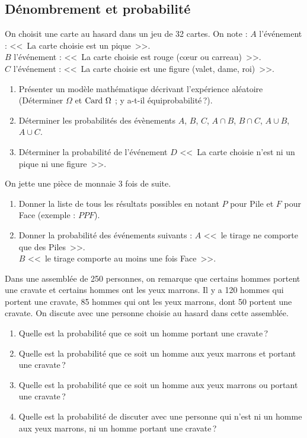 \subsection*{D\'enombrement et probabilit\'e}
\begin{exo}\label{exo:proba-4}
On choisit une carte au hasard dans un jeu de 32 cartes. On note : \newline
$A$ l'événement : <<~La carte choisie est un pique~>>.                     \\
$B$ l'événement : <<~La carte choisie est rouge (cœur ou carreau)~>>.      \\
$C$ l'événement : <<~La carte choisie est une figure (valet, dame, roi)~>>.
\begin{enumerate}
\item Présenter un modèle mathématique décrivant l’expérience aléatoire 
      (D\'eterminer $\Omega$ et $\text{Card }\Omega$ ; y a-t-il \'equiprobabilit\'e\,?). \\
\item Déterminer les probabilités des évènements $A$, $B$, $C$, $A\cap B$, $B\cap C$, $A\cup B$, $A\cup C$.
\item Déterminer la probabilité de l'événement $D$ <<~La carte choisie n'est ni un pique ni une figure~>>.
\end{enumerate}
\end{exo}
%
\begin{exo}\label{exo:proba-5}
On jette une pièce de monnaie 3 fois de suite.
\begin{enumerate}
\item Donner la liste de tous les résultats possibles en notant $P$ pour Pile et $F$ pour Face (exemple : $PPF$).
\item Donner la probabilité des événements suivants : \newline
      $A$ <<~le tirage ne comporte que des Piles~>>.       \\
      $B$ <<~le tirage comporte au moins une fois Face~>>. 
\end{enumerate}
\end{exo}
%
\begin{exo}\label{exo:proba-6}
Dans une assemblée de 250 personnes, on remarque que certains hommes portent une cravate et certains hommes ont les yeux marrons. Il y a 120 hommes qui portent une cravate, 85 hommes qui ont les yeux marrons, dont 50 portent une cravate.
On discute avec une personne choisie au hasard dans cette assemblée.
\begin{enumerate}
\item Quelle est la probabilité que ce soit un homme portant une cravate\,?
\item Quelle est la probabilité que ce soit un homme aux yeux marrons et portant une cravate\,?
\item Quelle est la probabilité que ce soit un homme aux yeux marrons ou portant une cravate\,?
\item Quelle est la probabilité de discuter avec une personne qui n’est ni un homme aux yeux marrons, ni un homme portant une cravate\,?
\end{enumerate}
\end{exo}
